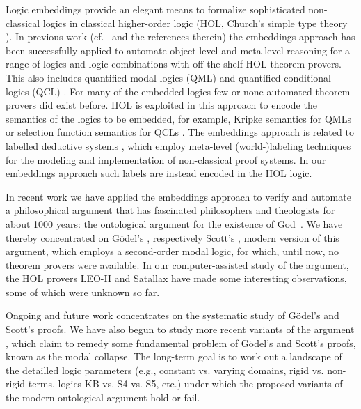 \documentclass{llncs}
\begin{document}
Logic embeddings provide an elegant means to formalize sophisticated
non-classical logics in classical higher-order logic (HOL, Church's
simple type theory \cite{Church40}). In previous work (cf.~\cite{C35}
and the references therein) the embeddings approach has been
successfully applied to automate object-level and meta-level reasoning
for a range of logics and logic combinations with off-the-shelf HOL
theorem provers. This also includes quantified modal logics (QML)
\cite{J23} and quantified conditional logics (QCL) \cite{C37}.  For
many of the embedded logics few or none automated theorem provers did
exist before. HOL is exploited in this approach to encode the
semantics of the logics to be embedded, for example, Kripke semantics
for QMLs \cite{fitting98} or selection function semantics for QCLs
\cite{Stalnaker68}.  The embeddings approach is related to labelled
deductive systems \cite{gabbay96}, which employ meta-level
(world-)labeling techniques for the modeling and implementation of
non-classical proof systems. In our embeddings approach such labels
are instead encoded in the HOL logic.

In recent work \cite{C40,J28} we have applied the embeddings
approach to verify and automate a philosophical argument that has
fascinated philosophers and theologists for about 1000 years: the
ontological argument for the existence of
God~\cite{sobel2004logic}. We have thereby concentrated on
G\"odel's \cite{GoedelNotes}, respectively  Scott's \cite{ScottNotes},
modern
version of this argument, which employs a second-order modal logic, for
which, until now, no theorem provers were available.  In our
computer-assisted study of the argument, the HOL provers LEO-II
\cite{C26} and Satallax \cite{Satallax} have made some interesting
observations, some of which were unknown so far.

Ongoing and future work concentrates on the systematic study of
G\"odel's and Scott's proofs. We have also begun to study more recent
variants of the argument
\cite{anderson90:_some_emend_of_goedel_ontol_proof,AndersonGettings,bjordal99,fuhrmann05:_exist_notwen,fitting02:_types_tableaus_god,Hajek2002,Hajek2008},
which claim to remedy some fundamental problem of G\"odel's and Scott's proofs, known as the modal collapse. The long-term goal
is to work out a  landscape of the detailled logic parameters (e.g., constant
vs. varying domains, rigid vs. non-rigid terms, logics KB vs.
S4 vs.  S5, etc.) under which the proposed variants of the 
modern ontological argument hold or fail.
\end{document}
